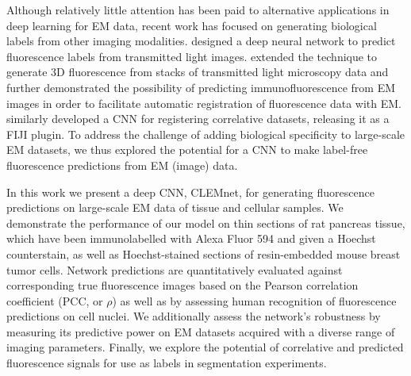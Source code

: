 Although relatively little attention has been paid to alternative applications in deep learning for EM data, recent work has focused on generating biological labels from other imaging modalities. \textcite{christiansen2018silico} designed a deep neural network to predict fluorescence labels from transmitted light images. \textcite{ounkomol2018label} extended the technique to generate 3D fluorescence from stacks of transmitted light microscopy data and further demonstrated the possibility of predicting immunofluorescence from EM images in order to facilitate automatic registration of fluorescence data with EM. \textcite{seifert2020deepclem} similarly developed a CNN for registering correlative datasets, releasing it as a FIJI plugin. To address the challenge of adding biological specificity to large-scale EM datasets, we thus explored the potential for a CNN to make label-free fluorescence predictions from EM (image) data.

In this work we present a deep CNN, CLEMnet, for generating fluorescence predictions on large-scale EM data of tissue and cellular samples. We demonstrate the performance of our model on thin sections of rat pancreas tissue, which have been immunolabelled with Alexa Fluor 594 and given a Hoechst counterstain, as well as Hoechst-stained sections of resin-embedded mouse breast tumor cells. Network predictions are quantitatively evaluated against corresponding true fluorescence images based on the Pearson correlation coefficient (PCC, or $\rho$) as well as by assessing human recognition of fluorescence predictions on cell nuclei. We additionally assess the network's robustness by measuring its predictive power on EM datasets acquired with a diverse range of imaging parameters. Finally, we explore the potential of correlative and predicted fluorescence signals for use as labels in segmentation experiments.
